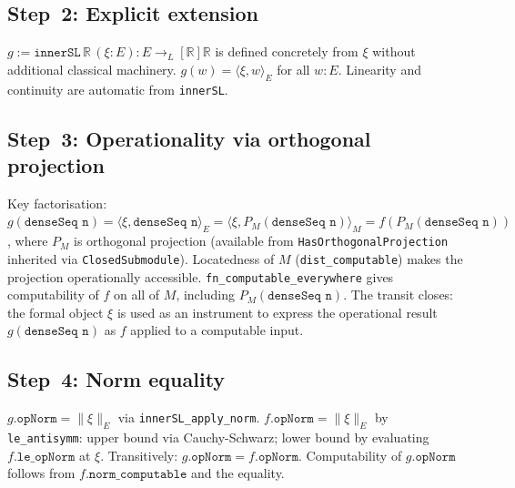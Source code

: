 \subsection*{Step~2: Explicit extension}

\begin{remark}
\label{rem:explicit_extension}
\leanok
$g := \texttt{innerSL}\,\mathbb{R}\,(\xi : E) : E \to_L[\mathbb{R}]
\mathbb{R}$ is defined concretely from $\xi$ without additional classical
machinery.  $g(w) = \langle\xi, w\rangle_E$ for all $w : E$.  Linearity
and continuity are automatic from \texttt{innerSL}.
\end{remark}

\subsection*{Step~3: Operationality via orthogonal projection}

\begin{remark}
\label{rem:orth_proj_transit}
\leanok
{}
Key factorisation: $g(\texttt{denseSeq n}) = \langle\xi, \texttt{denseSeq
n}\rangle_E = \langle\xi, P_M(\texttt{denseSeq n})\rangle_M
= f(P_M(\texttt{denseSeq n}))$, where $P_M$ is orthogonal projection
(available from \texttt{HasOrthogonalProjection} inherited via
\texttt{ClosedSubmodule}).  Locatedness of $M$ (\texttt{dist\_computable})
makes the projection operationally accessible.  \texttt{fn\_computable\_everywhere}
gives computability of $f$ on all of $M$, including $P_M(\texttt{denseSeq n})$.
The transit closes: the formal object $\xi$ is used as an instrument to
express the operational result $g(\texttt{denseSeq n})$ as $f$ applied
to a computable input.
\end{remark}

\subsection*{Step~4: Norm equality}

\begin{remark}
\label{rem:norm_equality}
\leanok
$g.\texttt{opNorm} = \|\xi\|_E$ via \texttt{innerSL\_apply\_norm}.
$f.\texttt{opNorm} = \|\xi\|_E$ by \texttt{le\_antisymm}: upper bound
via Cauchy-Schwarz; lower bound by evaluating $f.\texttt{le\_opNorm}$
at $\xi$.  Transitively: $g.\texttt{opNorm} = f.\texttt{opNorm}$.
Computability of $g.\texttt{opNorm}$ follows from
$f.\texttt{norm\_computable}$ and the equality.
\end{remark}

